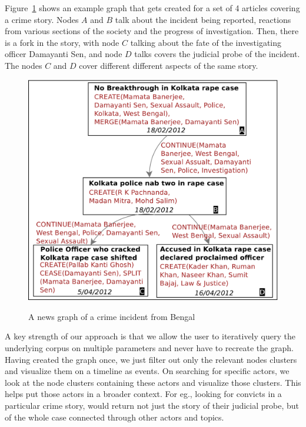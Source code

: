 Figure~\ref{fig:sample-news-graph} shows an example graph that gets created for a set of 4
articles covering a crime story. Nodes $A$ and $B$ talk about the incident being reported, reactions from various sections of the society and
the progress of investigation. Then, there is a fork in the story, with node $C$ talking about the fate of the investigating officer Damayanti Sen, 
and node $D$ talks covers the judicial probe of the incident. The nodes $C$ and $D$ cover different different aspects of the same story. 
\begin{figure}
\caption{A news graph of a crime incident from Bengal}
\includegraphics[scale=0.36]{figures/graph-1.pdf}
\label{fig:sample-news-graph}
\end{figure}
A key strength of our approach is that we allow the user to iteratively query the underlying corpus on multiple parameters and never have to recreate
the graph. Having created the graph once, we just filter out only the relevant nodes clusters and visualize them on a timeline as events. 
On searching for specific actors, we look at the node clusters containing these actors and visualize those clusters. This helps put those actors
in a broader context. For eg., looking for convicts in a particular crime story, would return not just the story of their judicial probe, but of
the whole case connected through other actors and topics.

